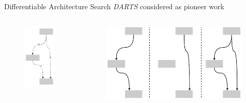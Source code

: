 \documentclass[]{beamer}
\begin{document}
\begin{frame}{Differentiable Architecture Search}
\vspace{10pt}
\textit{DARTS} \cite{Liu2018} considered as pioneer work
\vfill
\begin{columns}
\begin{column}{.32\textwidth}
\begin{figure}
	\includegraphics[scale=0.4, center]{graphics/quick/darts_0.drawio.pdf}
\end{figure}
\end{column}
\begin{column}{.68\textwidth}
\begin{figure}
	\includegraphics[scale=0.25, left]{graphics/quick/darts_0_candidates.drawio.pdf}

\end{figure}
\end{column}
\end{columns}
\end{frame}
\end{document}
